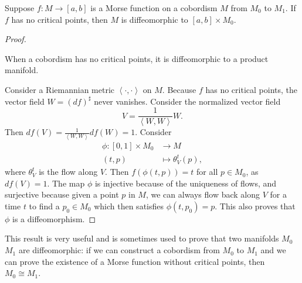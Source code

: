 \begin{prop}
    Suppose $f: M \to  [a, b]$ is a Morse function on a cobordism $M$ from  $ M_0$ to $ M_1$.
    If $f$ has no critical points, then $M$ is diffeomorphic to $[a, b] \times  M_0$.
\end{prop}
\begin{proof}
    \begin{marginfigure}
        \centering
        \caption{
            When a cobordism has no critical points, it is diffeomorphic to a product manifold. }
        \label{fig:proof-of-cobordism-without-critical-points}
    \end{marginfigure}
    Consider a Riemannian metric $\left<\cdot ,\cdot  \right>$ on $M$.
    Because  $f$ has no critical points, the vector field $W = (df)^{\sharp}$ never vanishes.
    Consider the normalized vector field
    \[
    V = \frac{1}{\left<W, W \right>} W
    .\] 
    Then $df(V) = \frac{1}{\left<W, W \right>} df(W) = 1$.
    Consider
    \begin{align*}
        \phi: [0, 1] \times M_0&\longrightarrow M \\
        (t, p) &\longmapsto \theta_V^{t}(p)
    ,\end{align*}
    where $\theta_V^{t}$ is the flow along $V$.
    Then $f(\phi(t, p)) = t$ for all $p \in M_0$, as $df(V) = 1$.
    The map $\phi$ is injective because of the uniqueness of flows, and surjective because given a point $p$ in $M$, we can always flow back along $V$ for a time $t$ to find a $p_0 \in M_0$ which then satisfies $\phi(t, p_0) = p$. 
    This also proves that $\phi$ is a diffeomorphism.
\end{proof}
This result is very useful and is sometimes used to prove that two manifolds $M_0$ $M_1$ are diffeomorphic: if we can construct a cobordism from $M_0$ to $M_1$ and we can prove the existence of a Morse function without critical points, then $M_0 \cong M_1$.

